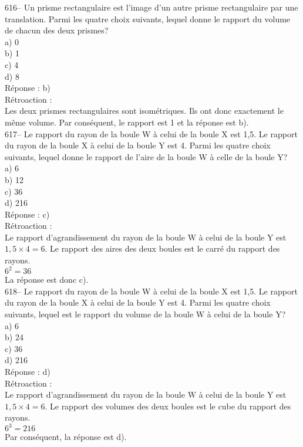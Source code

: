 ﻿\documentclass[letterpaper, 12pt]{article}
\begin{document}
616-- Un prisme rectangulaire est l'image d'un autre prisme rectangulaire
par une translation.  Parmi les quatre choix suivants, lequel donne le
rapport du volume de chacun des deux prismes?\\
a) 0\\
b) 1\\
c) 4\\
d) 8\\

R\'eponse : b)\\

R\'etroaction : \\
Les deux prismes rectangulaires sont isom\'etriques.  Ils ont donc
exactement le m\^eme volume.  Par cons\'equent, le rapport est 1 et la
r\'eponse est b).\\

617-- Le rapport du rayon de la boule W \`a celui de la boule X est 1,5.  Le
rapport du rayon de la boule X \`a celui de la boule Y est 4.  Parmi les
quatre choix suivants, lequel donne le rapport de l'aire de la boule W \`a
celle de la boule Y?\\
a) 6\\
b) 12\\
c) 36\\
d) 216\\

R\'eponse : c)\\

R\'etroaction : \\
Le rapport d'agrandissement du rayon de la boule W \`a celui de la boule Y
est $1,5\times4=6$.  Le rapport des aires des deux boules est le carr\'e du
rapport des rayons.\\
$6^{2}=36$\\
La r\'eponse est donc c).\\

618-- Le rapport du rayon de la boule W \`a celui de la boule X est 1,5.  Le
rapport du rayon de la boule X \`a celui de la boule Y est 4.  Parmi les
quatre choix suivants, lequel est le rapport du volume de la boule W \`a
celui de la boule Y?\\
a) 6\\
b) 24\\
c) 36\\
d) 216\\

R\'eponse : d)\\

R\'etroaction : \\
Le rapport d'agrandissement du rayon de la boule W \`a celui de la boule Y
est $1,5\times4=6$.  Le rapport des volumes des deux boules est le cube du
rapport des rayons.\\
$6^{3}=216$  \\
Par cons\'equent, la r\'eponse est d).\\
\end{document}

